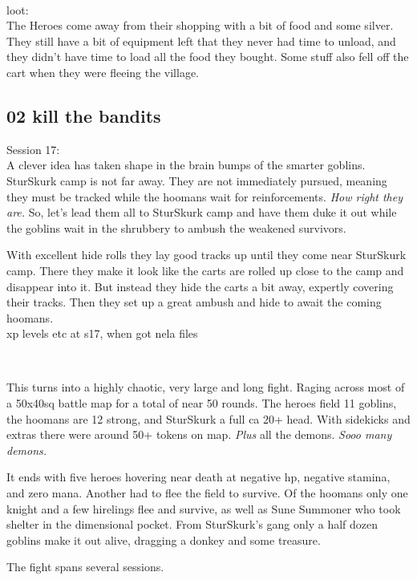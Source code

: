 \

loot:\\
The Heroes come away from their shopping with a bit of food and some silver. They still have a bit of equipment left that they never had time to unload, and they didn't have time to load all the food they bought. Some stuff also fell off the cart when they were fleeing the village.


\subsection*{02 kill the bandits}
\label{playthroughkillthebandits}

\forceindent Session 17:\\                                              %
A clever idea has taken shape in the brain bumps of the smarter goblins. SturSkurk camp is not far away. They are not immediately pursued, meaning they must be tracked while the hoomans wait for reinforcements. \emph{How right they are.} So, let's lead them all to SturSkurk camp and have them duke it out while the goblins wait in the shrubbery to ambush the weakened survivors.

With excellent hide rolls they lay good tracks up until they come near SturSkurk camp. There they make it look like the carts are rolled up close to the camp and disappear into it. But instead they hide the carts a bit away, expertly covering their tracks. Then they set up a great ambush and hide to await the coming hoomans.\\
\todo xp levels etc at s17, when got nela files

\

This turns into a highly chaotic, very large and long fight. Raging across most of a 50x40sq battle map for a total of near 50 rounds. The heroes field 11 goblins, the hoomans are 12 strong, and SturSkurk a full ca 20+ head. With sidekicks and extras there were around 50+ tokens on map. \emph{Plus} all the demons. \emph{Sooo many demons.}

It ends with five heroes hovering near death at negative hp, negative stamina, and zero mana. Another had to flee the field to survive. Of the hoomans only one knight and a few hirelings flee and survive, as well as Sune Summoner who took shelter in the dimensional pocket. From SturSkurk's gang only a half dozen goblins make it out alive, dragging a donkey and some treasure.

The fight spans several sessions.

